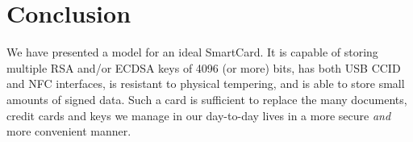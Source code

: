 \documentclass[11pt, twocolumn]{article}
\begin{document}
\section{Conclusion}
\label{sec:conclusion}

We have presented a model for an ideal SmartCard. It is capable of
storing multiple RSA and/or ECDSA keys of 4096 (or more) bits, has
both USB CCID and NFC interfaces, is resistant to physical tempering,
and is able to store small amounts of signed data. Such a card is
sufficient to replace the many documents, credit cards and keys we
manage in our day-to-day lives in a more secure \textit{and} more
convenient manner.



\end{document}
